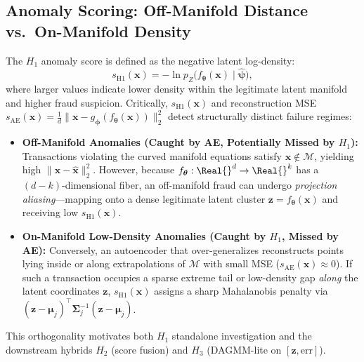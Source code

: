 \subsection{Anomaly Scoring: Off-Manifold Distance vs.\ On-Manifold Density}
\label{sec:p2_complementary_scoring}
The $H_1$ anomaly score is defined as the negative latent log-density:
\begin{equation}
    s_{\text{H1}}(\mathbf{x}) = -\ln p_Z\big(f_{\boldsymbol{\theta}}(\mathbf{x}) \mid \hat{\boldsymbol{\psi}}\big),
    \label{eq:h1_score}
\end{equation}
where larger values indicate lower density within the legitimate latent manifold and higher fraud suspicion. Critically, $s_{\text{H1}}(\mathbf{x})$ and reconstruction MSE $s_{\text{AE}}(\mathbf{x}) = \frac{1}{d}\|\mathbf{x} - g_{\boldsymbol{\phi}}(f_{\boldsymbol{\theta}}(\mathbf{x}))\|_2^2$ detect structurally distinct failure regimes:
\begin{itemize}
    \item \textbf{Off-Manifold Anomalies (Caught by AE, Potentially Missed by $H_1$):} Transactions violating the curved manifold equations satisfy $\mathbf{x} \notin \mathcal{M}$, yielding high $\|\mathbf{x} - \hat{\mathbf{x}}\|_2^2$. However, because $f_{\boldsymbol{\theta}}: \Real{}^d \to \Real{}^k$ has a $(d-k)$-dimensional fiber, an off-manifold fraud can undergo \emph{projection aliasing}---mapping onto a dense legitimate latent cluster $\mathbf{z} = f_{\boldsymbol{\theta}}(\mathbf{x})$ and receiving low $s_{\text{H1}}(\mathbf{x})$.
    \item \textbf{On-Manifold Low-Density Anomalies (Caught by $H_1$, Missed by AE):} Conversely, an autoencoder that over-generalizes \cite{gong2019memorizing} reconstructs points lying inside or along extrapolations of $\mathcal{M}$ with small MSE ($s_{\text{AE}}(\mathbf{x}) \approx 0$). If such a transaction occupies a sparse extreme tail or low-density gap \emph{along} the latent coordinates $\mathbf{z}$, $s_{\text{H1}}(\mathbf{x})$ assigns a sharp Mahalanobis penalty via $(\mathbf{z}-\boldsymbol{\mu}_j)^\top \boldsymbol{\Sigma}_j^{-1}(\mathbf{z}-\boldsymbol{\mu}_j)$.
\end{itemize}
This orthogonality motivates both $H_1$ standalone investigation and the downstream hybrids $H_2$ (score fusion) and $H_3$ (DAGMM-lite on $[\mathbf{z}, \text{err}]$).

